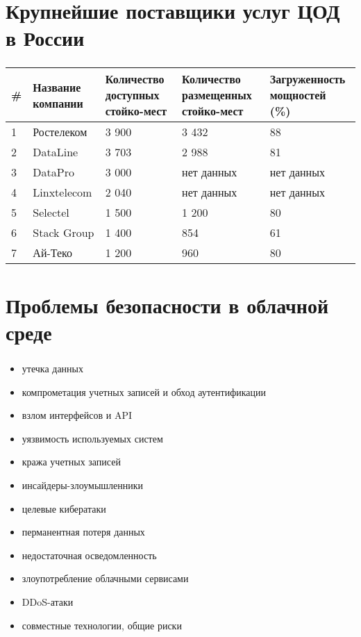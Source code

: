 
\section{Крупнейшие поставщики услуг ЦОД в России}

\begin{frame}
\frametitle{\insertsection}
\begin{table}[H]
  \begin{tabular}{|p{0.3cm}|p{2cm}|p{2cm}|p{2.3cm}|p{2.6cm}|}
  \hline \# & Название компании & Количество доступных стойко-мест & Количество размещенных стойко-мест & Загруженность мощностей (\%) \\
  \hline 1 & Ростелеком & 3 900 & 3 432 & 88 \\
  \hline 2 & DataLine & 3 703 & 2 988 & 81 \\
  \hline 3 & DataPro & 3 000 & нет данных & нет данных \\
  \hline 4 & Linxtelecom & 2 040 & нет данных & нет данных \\
  \hline 5 & Selectel & 1 500 & 1 200 & 80 \\
  \hline 6 & Stack Group & 1 400 & 854 & 61 \\
  \hline 7 & Ай-Теко & 1 200 & 960 & 80 \\
  \hline
  \end{tabular}
\end{table}
\end{frame}


\section{Проблемы безопасности в облачной среде}

\begin{frame}
\frametitle{\insertsection}

\begin{itemize}
    \item утечка данных
    \item компрометация учетных записей и обход аутентификации
    \item взлом интерфейсов и API
    \item уязвимость используемых систем
    \item кража учетных записей
    \item инсайдеры-злоумышленники
    \item целевые кибератаки
    \item перманентная потеря данных
    \item недостаточная осведомленность
    \item злоупотребление облачными сервисами
    \item DDoS-атаки
    \item совместные технологии, общие риски
\end{itemize}
\end{frame}

